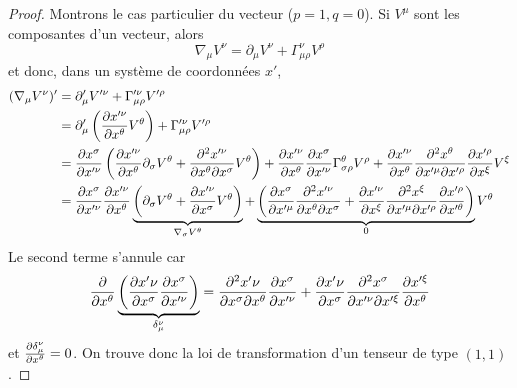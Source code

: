 \documentclass[a4paper,11pt]{report}
\theoremstyle{definition}
\theoremstyle{plain}
\theoremstyle{definition}
\theoremstyle{remark}
\newcommand{\p}{\partial}
\begin{document}
                \begin{proof}
                    Montrons le cas particulier du vecteur ($p=1,q=0$). Si $V^\mu$ sont les composantes d'un vecteur, alors
                    \begin{equation}
                        \nabla_\mu V^\nu = \p_\mu V^\nu + \Gamma^\nu_{\mu\rho} V^\rho
                    \end{equation}
                    et donc, dans un système de coordonnées $x'$, 
                    \begin{align}
                        (\nabla_\mu V^\nu)' &= \p'_\mu V'^\nu + \Gamma'^\nu_{\mu\rho} V'^\rho \\
                        &= \p'_\mu\left( \pdv{x'^\nu}{x^\theta} V^\theta\right) + \Gamma'^\nu_{\mu\rho} V'^\rho\\
                        &= \pdv{x^\sigma}{x'^\nu}\left( \pdv{x'^\nu}{x^\theta}\p_\sigma V^\theta + \pdv{x'^\nu}{x^\theta}{x^\sigma} V^\theta \right) + \pdv{x'^\nu}{x^\theta}\pdv{x^\sigma}{x'^\nu}\Gamma^\theta_{\sigma\rho} V^\rho + \pdv{x'^\nu}{x^\theta}\pdv{x^\theta}{x'^\mu}{x'^\rho}\pdv{x'^\rho}{x^\xi} V^\xi\\
                        &=  \pdv{x^\sigma}{x'^\nu} \pdv{x'^\nu}{x^\theta}\underbrace{\left(\p_\sigma V^\theta + \pdv{x'^\nu}{x^\sigma} V^\theta \right)}_{\nabla_\sigma V^\theta}+\underbrace{\left( \pdv{x^\sigma}{x'^\mu}\pdv{x'^\nu}{x^\theta}{x^\sigma}+\pdv{x'^\nu}{x^\xi}\pdv{x^\xi}{x'^\mu}{x'^\rho}\pdv{x'^\rho}{x'^\theta} \right)}_{0}V^\theta
                    \end{align}
                    Le second terme s'annule car
                    \begin{equation}
                        \pdv{}{x^\theta}\underbrace{\left( \pdv{x'\nu}{x^\sigma}\pdv{x^\sigma}{x'^\nu} \right)}_{\delta^\nu_\mu} = \pdv{x'\nu}{x^\sigma}{x^\theta}\pdv{x^\sigma}{x'^\nu} + \pdv{x'\nu}{x^\sigma}\pdv{x^\sigma}{x'^\nu}{x'^\xi}\pdv{x'^\xi}{x^\theta}
                    \end{equation}
                    et $ \pdv{\delta^\nu_\mu}{x^\theta} = 0$. On trouve donc la loi de transformation d'un tenseur de type $(1,1)$.
                \end{proof}
                
\end{document}
